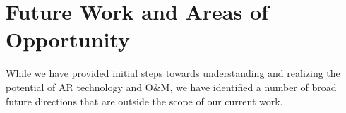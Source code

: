 \documentclass[chi_draft]{sigchi}
\newcommand{\OM}{O\&M\xspace}
\begin{document}
%
%
%
%


\section{Future Work and Areas of Opportunity}
While we have provided initial steps towards understanding and realizing the potential of AR technology and \OM, we have identified a number of broad future directions that are outside the scope of our current work.
\end{document}
